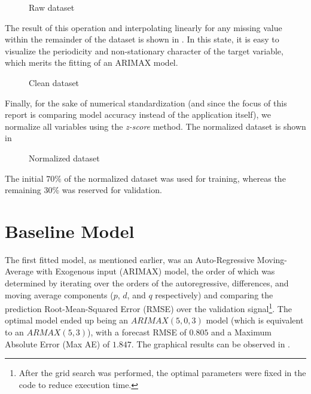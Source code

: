 \documentclass{scrartcl}
\begin{document}
  \begin{figure}[ht]
    \centering
    
    \caption{Raw dataset}
    \label{fig:timeseries_raw}
  \end{figure}

  The result of this operation and interpolating linearly for any missing value within the remainder of the dataset is shown in . In this state, it is easy to visualize the periodicity and non-stationary character of the target variable, which merits the fitting of an ARIMAX model.

  \begin{figure}[ht]
    \centering
    
    \caption{Clean dataset}
    \label{fig:timeseries_clean}
  \end{figure}

  Finally, for the sake of numerical standardization (and since the focus of this report is comparing model accuracy instead of the application itself), we normalize all variables using the \emph{z-score} method. The normalized dataset is shown in 

  \begin{figure}[ht]
    \centering
    
    \caption{Normalized dataset}
    \label{fig:timeseries_norm}
  \end{figure}

  The initial $70\%$ of the normalized dataset was used for training, whereas the remaining $30\%$ was reserved for validation.

\section{Baseline Model}

  The first fitted model, as mentioned earlier, was an Auto-Regressive Moving-Average with Exogenous input (ARIMAX) model, the order of which was determined by iterating over the orders of the autoregressive, differences, and moving average components ($p$, $d$, and $q$ respectively) and comparing the prediction Root-Mean-Squared Error (RMSE) over the validation signal\footnote{After the grid search was performed, the optimal parameters were fixed in the code to reduce execution time.}. The optimal model ended up being an $ARIMAX(5,0,3)$ model (which is equivalent to an $ARMAX(5,3)$), with a forecast RMSE of $0.805$ and a Maximum Absolute Error (Max AE) of $1.847$. The graphical results can be observed in .
\end{document}
